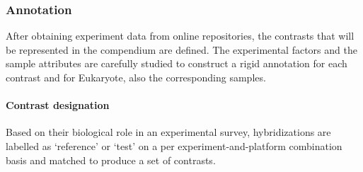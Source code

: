 




\subsubsection{Annotation}


%
After obtaining experiment data from online repositories, the contrasts that
will be represented in the compendium are defined.  The experimental factors
and the sample attributes are carefully studied to construct a rigid annotation
for each contrast and for Eukaryote, also the corresponding samples.
%


\paragraph{Contrast designation}
Based on their biological role in an experimental survey, hybridizations are
labelled as `reference' or `test' on a per experiment-and-platform combination
basis and matched to produce a set of contrasts.

